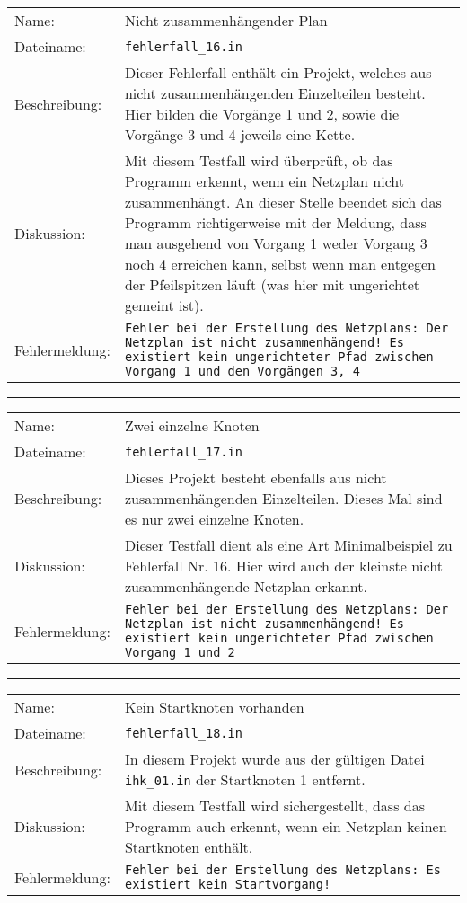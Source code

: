 \begin{tabularx}{\textwidth}{l X}
  Name: & Nicht zusammenh\"angender Plan \\
  Dateiname: & \texttt{fehlerfall\_16.in} \\
  Beschreibung: & Dieser Fehlerfall enth\"alt ein Projekt, welches aus
  nicht zusammenh\"angenden Einzelteilen besteht. Hier bilden die
  Vorg\"ange 1 und 2, sowie die Vorg\"ange 3 und 4 jeweils eine Kette.\\
  Diskussion: & Mit diesem Testfall wird \"uberpr\"uft, ob das
  Programm erkennt, wenn ein Netzplan nicht zusammenh\"angt. An dieser
  Stelle beendet sich das Programm richtigerweise mit der Meldung,
  dass man ausgehend von Vorgang 1 weder Vorgang 3 noch 4 erreichen
  kann, selbst wenn man entgegen der Pfeilspitzen l\"auft (was hier
  mit ungerichtet gemeint ist).\\
  Fehlermeldung: & \texttt{Fehler bei der Erstellung des Netzplans:
    Der Netzplan ist nicht zusammenhängend! Es existiert kein
    ungerichteter Pfad zwischen Vorgang 1 und den Vorgängen 3, 4} \\
\end{tabularx}
\hrule
\begin{tabularx}{\textwidth}{l X}
  Name: & Zwei einzelne Knoten \\
  Dateiname: & \texttt{fehlerfall\_17.in} \\
  Beschreibung: & Dieses Projekt besteht ebenfalls aus nicht
  zusammenh\"angenden Einzelteilen. Dieses Mal sind es nur zwei
  einzelne Knoten.\\
  Diskussion: & Dieser Testfall dient als eine Art Minimalbeispiel zu
  Fehlerfall Nr. 16. Hier wird auch der kleinste nicht
  zusammenh\"angende Netzplan erkannt.\\
  Fehlermeldung: & \texttt{Fehler bei der Erstellung des Netzplans:
    Der Netzplan ist nicht zusammenhängend! Es existiert kein
    ungerichteter Pfad zwischen Vorgang 1 und 2} \\
\end{tabularx}
\hrule
\begin{tabularx}{\textwidth}{l X}
  Name: & Kein Startknoten vorhanden \\
  Dateiname: & \texttt{fehlerfall\_18.in} \\
  Beschreibung: & In diesem Projekt wurde aus der g\"ultigen Datei
  \texttt{ihk\_01.in} der Startknoten 1 entfernt.\\
  Diskussion: & Mit diesem Testfall wird sichergestellt, dass das
  Programm auch erkennt, wenn ein Netzplan keinen Startknoten
  enth\"alt.\\
  Fehlermeldung: & \texttt{Fehler bei der Erstellung des Netzplans: Es
    existiert kein Startvorgang!} \\
\end{tabularx}
